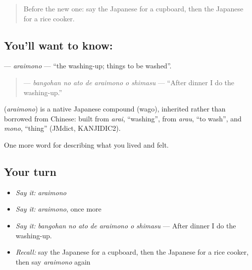 \label{lesson:JA-C493-araimono}



\begin{quote}
Before the new one: say the Japanese for a cupboard, then the Japanese for a rice cooker.
\end{quote}

\subsection*{You'll want to know: }
\textbf{} — \emph{araimono} — \textquotedblleft{}the washing-up; things to be washed\textquotedblright{}.

\begin{quote}
\textbf{   } — \emph{bangohan no ato de araimono o shimasu} — \textquotedblleft{}After dinner I do the washing-up.\textquotedblright{}
\end{quote}

\begin{cousinweb}
\textbf{} (\emph{araimono}) is a native Japanese compound (wago), inherited rather than borrowed from Chinese: built from \emph{arai}, \textquotedblleft{}washing\textquotedblright{}, from \emph{arau}, \textquotedblleft{}to wash\textquotedblright{}, and \emph{mono}, \textquotedblleft{}thing\textquotedblright{} (JMdict, KANJIDIC2).
\end{cousinweb}

\begin{grammarlens}[title={What you've built}]
One more word for describing what you lived and felt.
\end{grammarlens}

\subsection*{Your turn}
\begin{itemize}
\raggedright
  \item \emph{Say it:} \emph{araimono}
  \item \emph{Say it:} \emph{araimono}, once more
  \item \emph{Say it:} \emph{bangohan no ato de araimono o shimasu} — After dinner I do the washing-up.
  \item \emph{Recall:} say the Japanese for a cupboard, then the Japanese for a rice cooker, then say \emph{araimono} again
\end{itemize}

